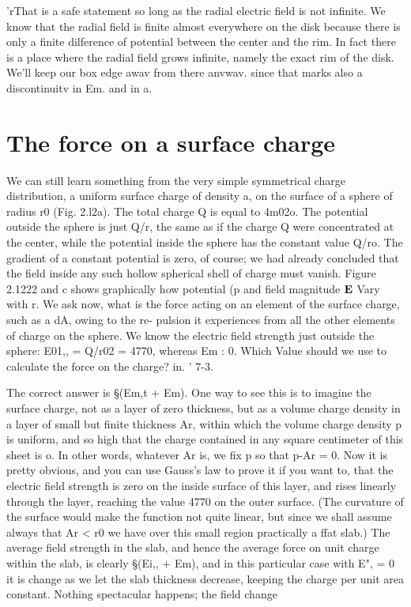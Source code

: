 'rThat is a safe statement so long as the radial electric field is not infinite. We know
that the radial field is finite almost everywhere on the disk because there is only a finite
dilference of potential between the center and the rim. In fact there is a place where
the radial field grows infinite, namely the exact rim of the disk. We'll keep our box
edge awav from there anvwav. since that marks also a discontinuitv in Em. and in a.

\section{The force on a surface charge}

We can still learn something from the very simple symmetrical
charge distribution, a uniform surface charge of density a, on the
surface of a sphere of radius r0 (Fig. 2.l2a). The total charge Q is
equal to 4m02o. The potential outside the sphere is just Q/r, the
same as if the charge Q were concentrated at the center, while the
potential inside the sphere has the constant value Q/ro. The gradient
of a constant potential is zero, of course; we had already concluded
that the field inside any such hollow spherical shell of charge must
vanish. Figure 2.1222 and c shows graphically how potential (p and
field magnitude $\mathbf{E}$ Vary with r. We ask now, what is the force acting
on an element of the surface charge, such as a dA, owing to the re-
pulsion it experiences from all the other elements of charge on the
sphere. We know the electric field strength just outside the sphere:
E01,, = Q/r02 = 4770, whereas Em : 0. Which Value should we use
to calculate the force on the charge? in. ' 7-3.

The correct answer is §(Em,t + Em). One way to see this is to
imagine the surface charge, not as a layer of zero thickness, but as a
volume charge density in a layer of small but finite thickness Ar,
within which the volume charge density p is uniform, and so high that
the charge contained in any square centimeter of this sheet is o. In
other words, whatever Ar is, we fix p so that p-Ar = 0. Now it is
pretty obvious, and you can use Gauss's law to prove it if you want to,
that the electric field strength is zero on the inside surface of this
layer, and rises linearly through the layer, reaching the value 4770 on
the outer surface. (The curvature of the surface would make the
function not quite linear, but since we shall assume always that
Ar < r0 we have over this small region practically a ffat slab.) The
average field strength in the slab, and hence the average force on unit
charge within the slab, is clearly §(Ei,, + Em), and in this particular
case with E", = 0 it is %
change as we let the slab thickness decrease, keeping the charge per
unit area constant. Nothing spectacular happens; the field change

